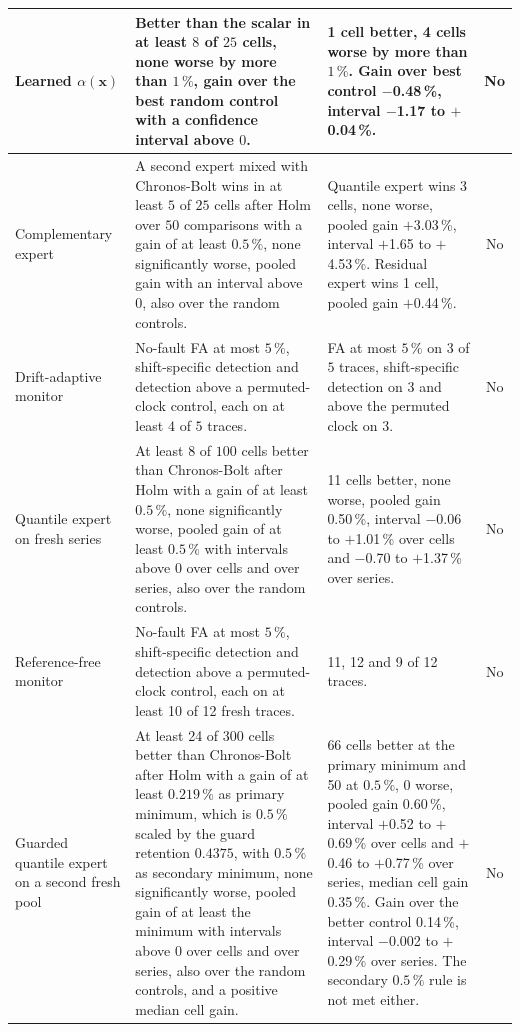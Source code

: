 {\begin{longtable}{p{1.9cm} p{4.4cm} p{5.2cm} c}
\midrule
Learned $\alpha(\mathbf{x})$ & Better than the scalar in at least $8$ of $25$ cells, none worse by more than $1\,\%$, gain over the best random control with a confidence interval above $0$. & 1 cell better, 4 cells worse by more than $1\,\%$. Gain over best control $-$0.48\,\%, interval $-$1.17 to $+$0.04\,\%. & No \\
\midrule
Complementary expert & A second expert mixed with Chronos-Bolt wins in at least $5$ of $25$ cells after Holm over $50$ comparisons with a gain of at least $0.5\,\%$, none significantly worse, pooled gain with an interval above $0$, also over the random controls. & Quantile expert wins 3 cells, none worse, pooled gain $+$3.03\,\%, interval $+$1.65 to $+$4.53\,\%. Residual expert wins 1 cell, pooled gain $+$0.44\,\%. & No \\
\midrule
Drift-adaptive monitor & No-fault FA at most $5\,\%$, shift-specific detection and detection above a permuted-clock control, each on at least $4$ of $5$ traces. & FA at most $5\,\%$ on 3 of $5$ traces, shift-specific detection on 3 and above the permuted clock on 3. & No \\
\midrule
Quantile expert on fresh series & At least $8$ of $100$ cells better than Chronos-Bolt after Holm with a gain of at least $0.5\,\%$, none significantly worse, pooled gain of at least $0.5\,\%$ with intervals above $0$ over cells and over series, also over the random controls. & 11 cells better, none worse, pooled gain 0.50\,\%, interval $-$0.06 to $+$1.01\,\% over cells and $-$0.70 to $+$1.37\,\% over series. & No \\
\midrule
Reference-free monitor & No-fault FA at most $5\,\%$, shift-specific detection and detection above a permuted-clock control, each on at least 10 of 12 fresh traces. & 11, 12 and 9 of 12 traces. & No \\
\midrule
Guarded quantile expert on a second fresh pool & At least 24 of 300 cells better than Chronos-Bolt after Holm with a gain of at least $0.219\,\%$ as primary minimum, which is $0.5\,\%$ scaled by the guard retention $0.4375$, with $0.5\,\%$ as secondary minimum, none significantly worse, pooled gain of at least the minimum with intervals above $0$ over cells and over series, also over the random controls, and a positive median cell gain. & 66 cells better at the primary minimum and 50 at $0.5\,\%$, 0 worse, pooled gain 0.60\,\%, interval $+$0.52 to $+$0.69\,\% over cells and $+$0.46 to $+$0.77\,\% over series, median cell gain 0.35\,\%. Gain over the better control 0.14\,\%, interval $-$0.002 to $+$0.29\,\% over series. The secondary $0.5\,\%$ rule is not met either. & No \\

\end{longtable}}
